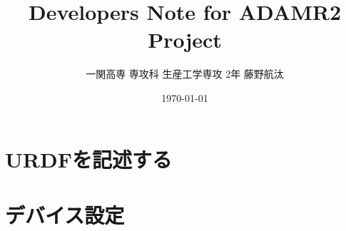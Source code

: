 \documentclass[uplatex, a4paper]{jsreport}
\title{\Huge Developers Note for ADAMR2 Project}
\author{一関高専 専攻科 生産工学専攻 2年 藤野航汰}
\date{\today}
\begin{document}
\maketitle  %

\tableofcontents  %
\newpage

\chapter{URDFを記述する}








\chapter{デバイス設定}




\end{document}
